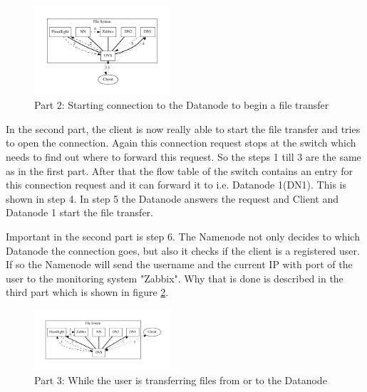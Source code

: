 \begin{figure}[htp]
\centering
\includegraphics[width=0.45\textwidth]{img/connectionToDatanode} 
\caption{Part 2: Starting connection to the Datanode to begin a file transfer}
\label{dn}
\end{figure}     

In the second part, the client is now really able to start the file transfer and tries to open the connection. Again this connection request stops at the switch which needs to find out where to forward this request. So the steps 1 till 3 are the same as in the first part. After that the flow table of the switch contains an entry for this connection request and it can forward it to i.e. Datanode 1(DN1). This is shown in step 4. In step 5 the Datanode answers the request and Client and Datanode 1 start the file transfer. 

Important in the second part is step 6. The Namenode not only decides to which Datanode the connection goes, but also it checks if the client is a registered user. If so the Namenode will send the username and the current IP with port of the user to the monitoring system "Zabbix". Why that is done is described in the third part which is shown in figure \ref{wc}.    

\begin{figure}[htp]
\centering
\includegraphics[width=0.45\textwidth]{img/whileConnection} 
\caption{Part 3: While the user is transferring files from or to the Datanode}
\label{wc}
\end{figure}

